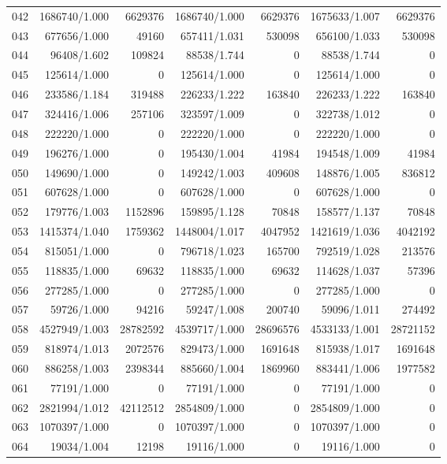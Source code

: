 \begin{longtable}{crrrrrr}
042 & 1686740/1.000 & 6629376 & 1686740/1.000 & 6629376 & 1675633/1.007 & 6629376 \\
043 & 677656/1.000 & 49160 & 657411/1.031 & 530098 & 656100/1.033 & 530098 \\
044 & 96408/1.602 & 109824 & 88538/1.744 & 0 & 88538/1.744 & 0 \\
045 & 125614/1.000 & 0 & 125614/1.000 & 0 & 125614/1.000 & 0 \\
046 & 233586/1.184 & 319488 & 226233/1.222 & 163840 & 226233/1.222 & 163840 \\
047 & 324416/1.006 & 257106 & 323597/1.009 & 0 & 322738/1.012 & 0 \\
048 & 222220/1.000 & 0 & 222220/1.000 & 0 & 222220/1.000 & 0 \\
049 & 196276/1.000 & 0 & 195430/1.004 & 41984 & 194548/1.009 & 41984 \\
050 & 149690/1.000 & 0 & 149242/1.003 & 409608 & 148876/1.005 & 836812 \\
051 & 607628/1.000 & 0 & 607628/1.000 & 0 & 607628/1.000 & 0 \\
052 & 179776/1.003 & 1152896 & 159895/1.128 & 70848 & 158577/1.137 & 70848 \\
053 & 1415374/1.040 & 1759362 & 1448004/1.017 & 4047952 & 1421619/1.036 & 4042192 \\
054 & 815051/1.000 & 0 & 796718/1.023 & 165700 & 792519/1.028 & 213576 \\
055 & 118835/1.000 & 69632 & 118835/1.000 & 69632 & 114628/1.037 & 57396 \\
056 & 277285/1.000 & 0 & 277285/1.000 & 0 & 277285/1.000 & 0 \\
057 & 59726/1.000 & 94216 & 59247/1.008 & 200740 & 59096/1.011 & 274492 \\
058 & 4527949/1.003 & 28782592 & 4539717/1.000 & 28696576 & 4533133/1.001 & 28721152 \\
059 & 818974/1.013 & 2072576 & 829473/1.000 & 1691648 & 815938/1.017 & 1691648 \\
060 & 886258/1.003 & 2398344 & 885660/1.004 & 1869960 & 883441/1.006 & 1977582 \\
061 & 77191/1.000 & 0 & 77191/1.000 & 0 & 77191/1.000 & 0 \\
062 & 2821994/1.012 & 42112512 & 2854809/1.000 & 0 & 2854809/1.000 & 0 \\
063 & 1070397/1.000 & 0 & 1070397/1.000 & 0 & 1070397/1.000 & 0 \\
064 & 19034/1.004 & 12198 & 19116/1.000 & 0 & 19116/1.000 & 0 \\

\end{longtable}
